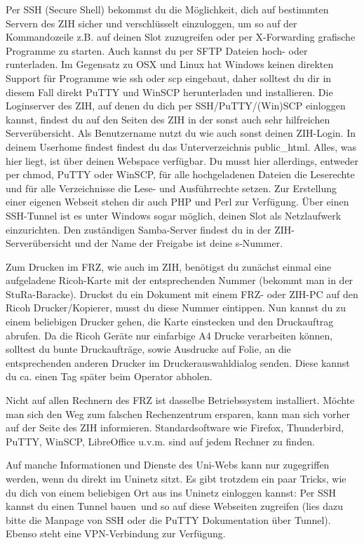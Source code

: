 Per SSH (Secure Shell) bekommst du die Möglichkeit, dich auf bestimmten Servern des ZIH sicher und verschlüsselt einzuloggen, um so auf der Kommandozeile z.B. auf deinen Slot zuzugreifen oder per X-Forwarding grafische Programme zu starten.
Auch kannst du per SFTP Dateien hoch- oder runterladen.
Im Gegensatz zu OSX und Linux hat Windows keinen direkten Support für Programme wie ssh oder scp eingebaut, daher solltest du dir in diesem Fall direkt PuTTY und WinSCP herunterladen und installieren.
Die Loginserver des ZIH, auf denen du dich per SSH/PuTTY/(Win)SCP einloggen kannst, findest du auf den Seiten des ZIH in der sonst auch sehr hilfreichen Serverübersicht.
Als Benutzername nutzt du wie auch sonst deinen ZIH-Login.
In deinem Userhome findest findest du das Unterverzeichnis public\_html.
Alles, was hier liegt, ist über deinen Webspace verfügbar.
Du musst hier allerdings, entweder per chmod, PuTTY oder WinSCP, für alle hochgeladenen Dateien die Leserechte und für alle Verzeichnisse die Lese- und Ausführrechte setzen.
Zur Erstellung einer eigenen Webseit stehen dir auch PHP und Perl zur Verfügung.
Über einen SSH-Tunnel ist es unter Windows sogar möglich, deinen Slot als Netzlaufwerk einzurichten.
Den zuständigen Samba-Server findest du in der ZIH-Serverübersicht und der Name der Freigabe ist deine s-Nummer.

Zum Drucken im FRZ, wie auch im ZIH, benötigst du zunächst einmal eine aufgeladene Ricoh-Karte mit der entsprechenden Nummer (bekommt man in der StuRa-Baracke).
Druckst du ein Dokument mit einem FRZ- oder ZIH-PC auf den Ricoh Drucker/Kopierer, musst du diese Nummer eintippen.
Nun kannst du zu einem beliebigen Drucker gehen, die Karte einstecken und den Druckauftrag abrufen.
Da die Ricoh Geräte nur einfarbige A4 Drucke verarbeiten können, solltest du bunte Druckaufträge, sowie Ausdrucke auf Folie, an die entsprechenden anderen Drucker im Druckerauswahldialog senden.
Diese kannst du ca. einen Tag später beim Operator abholen.

Nicht auf allen Rechnern des FRZ ist dasselbe Betriebssystem installiert.
Möchte man sich den Weg zum falschen Rechenzentrum ersparen, kann man sich vorher auf der Seite des ZIH informieren.
Standardsoftware wie Firefox, Thunderbird, PuTTY, WinSCP, LibreOffice u.v.m. sind auf jedem Rechner zu finden.

Auf manche Informationen und Dienste des Uni-Webs kann nur zugegriffen werden, wenn du direkt im Uninetz sitzt.
Es gibt trotzdem ein paar Tricks, wie du dich von einem beliebigen Ort aus ins Uninetz einloggen kannst:
Per SSH kannst du \glqq einen Tunnel bauen\grqq \ und so auf diese Webseiten zugreifen (lies dazu bitte die Manpage von SSH oder die PuTTY Dokumentation über Tunnel).
Ebenso steht eine VPN-Verbindung zur Verfügung.

